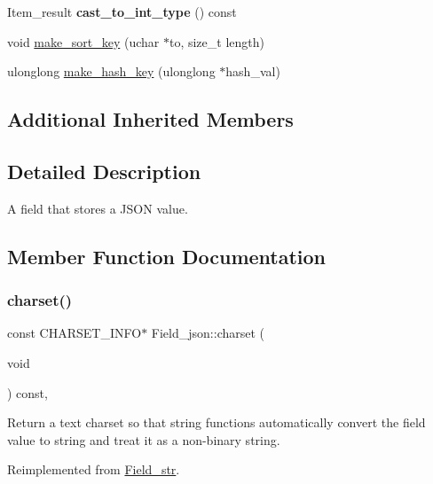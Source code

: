 \begin{DoxyCompactItemize}
\item 
\mbox{\label{classField__json_acb15d1d878cf54040194c61e5d513d89}} 
Item\+\_\+result {\bfseries cast\+\_\+to\+\_\+int\+\_\+type} () const
\item 
void \mbox{\hyperlink{classField__json_a601df7458aaa98d5c1f80d5bc2d35f3d}{make\+\_\+sort\+\_\+key}} (uchar $\ast$to, size\+\_\+t length)
\item 
ulonglong \mbox{\hyperlink{classField__json_ad9ff7288981a5d476df6b8362d4891cd}{make\+\_\+hash\+\_\+key}} (ulonglong $\ast$hash\+\_\+val)
\end{DoxyCompactItemize}
\subsection*{Additional Inherited Members}


\subsection{Detailed Description}
A field that stores a J\+S\+ON value. 

\subsection{Member Function Documentation}
\mbox{\label{classField__json_a1ea43b4e58fea6167615f66a74bdda5e}} 
\subsubsection{\texorpdfstring{charset()}{charset()}}
{\footnotesize\ttfamily const C\+H\+A\+R\+S\+E\+T\+\_\+\+I\+N\+FO$\ast$ Field\+\_\+json\+::charset (\begin{DoxyParamCaption}\item[{void}]{ }\end{DoxyParamCaption}) const\hspace{0.3cm}{\ttfamily [inline]}, {\ttfamily [virtual]}}

Return a text charset so that string functions automatically convert the field value to string and treat it as a non-\/binary string. 

Reimplemented from \mbox{\hyperlink{classField__str}{Field\+\_\+str}}.

\mbox{\label{classField__json_a935f845046fd5b3e0a031e736cca69e2}} 
